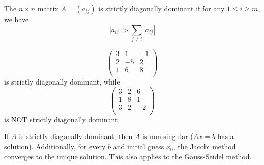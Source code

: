 \documentclass[11pt]{article}
\begin{document}
\begin{definition}
    The $n \times n$ matrix $A = (a_{ij})$ is strictly diagonally dominant if for any $1 \le i \ge m$, we have
    \[
        |a_{ii}| > \sum_{j\ne i }|a_{ij}| 
    \]
\end{definition}
\begin{example}
    \[
    \begin{pmatrix}
        3 & 1 & -1\\
        2 & -5 & 2 \\
        1 & 6 & 8 \\
    \end{pmatrix}
    \]
    is strictly diagonally dominant, while
    \[
        \begin{pmatrix}
            3 & 2 & 6\\
            1 & 8 & 1 \\
            3 & 2 & -2 \\
        \end{pmatrix}
    \]
    is NOT strictly diagonally dominant.
\end{example}
\begin{theorem}
    If $A$ is strictly diagonally dominant, then $A$ is non-singular ($Ax=b$ has a solution).
    Additionally, for every $b$ and initial guess $x_0$, the Jacobi method converges to the unique solution.
    This also applies to the Gauss-Seidel method.
\end{theorem}
\end{document}

